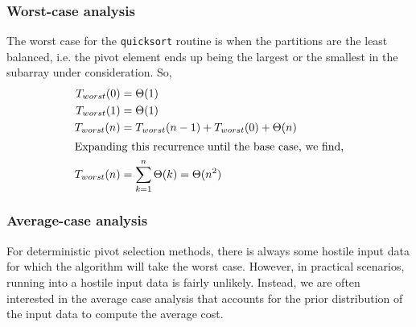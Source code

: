\documentclass[]{finalproject}
\begin{document}
\subsubsection{Worst-case analysis}

The worst case for the \texttt{quicksort} routine is when the partitions are the least balanced, i.e. the pivot element ends up being the largest or the smallest in the subarray under consideration. So,
\begin{align*}
T_{worst}(0) &= \Theta(1) \\
T_{worst}(1) &= \Theta(1) \\
T_{worst}(n) &= T_{worst}(n-1) + T_{worst}(0) + \Theta(n) \\
\shortintertext{Expanding this recurrence until the base case, we find,}
T_{worst}(n) &= \sum_{k=1}^n\Theta(k) = \Theta(n^2)
\end{align*}

\subsubsection{Average-case analysis}

For deterministic pivot selection methods, there is always some hostile input data for which the algorithm will take the worst case. However, in practical scenarios, running into a hostile input data is fairly unlikely. Instead, we are often interested in the average case analysis that accounts for the prior distribution of the input data to compute the average cost.
\end{document}
